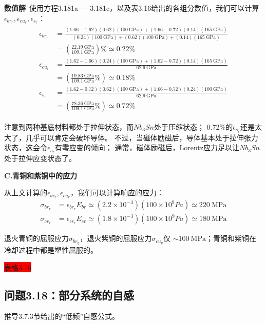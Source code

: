 \textbf{数值解}\ 使用方程3.181a — 3.181c，以及表3.16给出的各组分数值，我们可以计算
$\epsilon_{br_r},\epsilon_{cu_r}, \epsilon_{s_r}$：
\begin{eqnarray*}%
\begin{split}
\epsilon_{br_r}&=\frac{(1.66-1.62)(0.62)(100\ \mathrm{GPa})+(1.66-0.72)(0.14)(165\ \mathrm{GPa})}{(0.24)(100\ \mathrm{GPa})+(0.62)(100\ \mathrm{GPa})+(0.14)(165\ \mathrm{GPa})}\\
&=(\frac{22.19\ \mathrm{GPa}}{109.1\ \mathrm{GPa}})\% \simeq0.22\% \\
\epsilon_{cu_r}&=\frac{(1.62-1.66)(0.24)(100\ \mathrm{GPa})+(1.62-0.72)(0.14)(165\ \mathrm{GPa})}{62.9\ \mathrm{GPa}}\\
&=(\frac{19.83\ \mathrm{GPa}}{109.1\ \mathrm{GPa}}\%)\simeq0.18\% \\
\epsilon_{s_r}&=\frac{(1.62-0.72)(0.62)(100\ \mathrm{GPa})+(1.66-0.72)(0.24)(100\ \mathrm{GPa})}{62.9\ \mathrm{GPa}}\\
&=(\frac{78.36\ \mathrm{GPa}}{109.1\ \mathrm{GPa}}\%)\simeq0.72\% 
\end{split}
\end{eqnarray*}

注意到两种基底材料都处于拉伸状态，而$Nb_3Sn$处于压缩状态；
0.72\%的$\epsilon_{s_r}$还是太大了，几乎可以肯定会破坏导体。
不过，当磁体励磁后，导体基本处于拉伸张力状态，这会令$\epsilon_{s_r}$有零应变的倾向；
通常，磁体励磁后，Lorentz应力足以让$Nb_3Sn$处于拉伸应变状态了。

\textbf{C.青铜和紫铜中的应力}

从上文计算的$\epsilon_{br_r},\epsilon_{cu_r}$，我们可以计算响应的应力：
 \begin{eqnarray*}
\sigma_{br_r}&=\epsilon_{br_r}E_{br}\simeq(2.2\times10^{-3})(100\times10^9Pa)\simeq220\ \mathrm{MPa}\\
\sigma_{cr_r}&=\epsilon_{cr_r}E_{cr}\simeq(1.8\times10^{-3})(100\times10^9Pa)\simeq180\ \mathrm{MPa}
\end{eqnarray*}

退火青铜的屈服应力$\sigma_{br_y}$，退火紫铜的屈服应力$\sigma_{cu_y}$仅
$\sim 100\ \mathrm{MPa}$；青铜和紫铜在冷却过程中都是塑性屈服的。

\colorbox{red}{表格3.16}

\newpage



\subsection{问题3.18：部分系统的自感}
推导3.7.3节给出的“低频”自感公式。

